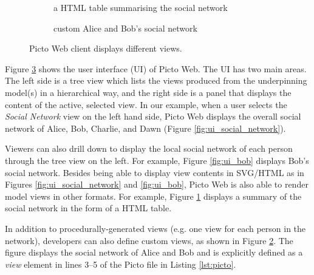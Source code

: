 \documentclass[sigconf,review]{acmart}
\begin{document}
\begin{figure}[h]
\begin{subfigure}{0.49\textwidth}
    \caption{a HTML table summarising the social network}
    \label{fig:ui_tabular}
  \end{subfigure}
  \hfill
  \begin{subfigure}{0.49\textwidth}
    \caption{custom Alice and Bob's social network}
    \label{fig:ui_custom}
  \end{subfigure}
  \hfill
  \caption{Picto Web client displays different views.}
  \label{fig:ui}
\end{figure}

Figure \ref{fig:ui} shows the user interface (UI) of Picto Web. The UI has two main areas. The left side is a tree view which lists the views produced from the underpinning model(s) in a hierarchical way, and the right side is a panel that displays the content of the active, selected view. In our example, when a user selects the \emph{Social Network} view on the left hand side, Picto Web displays the overall social network of Alice, Bob, Charlie, and Dawn (Figure \ref{fig:ui_social_network}). 

Viewers can also drill down to display the local social network of each person through the tree view on the left. For example, Figure \ref{fig:ui_bob} displays Bob's social network. Besides being able to display view contents in SVG/HTML as in Figures \ref{fig:ui_social_network} and \ref{fig:ui_bob}, Picto Web is also able to render model views in other formats. For example, Figure \ref{fig:ui_tabular} displays a summary of the social network in the form of a HTML table. 

In addition to procedurally-generated views (e.g. one view for each person in the network), developers can also define custom views, as shown in Figure \ref{fig:ui_custom}. The figure displays the social network of Alice and Bob and is explicitly defined as a \emph{view} element in lines 3--5 of the Picto file in Listing \ref{lst:picto}.
\end{document}
